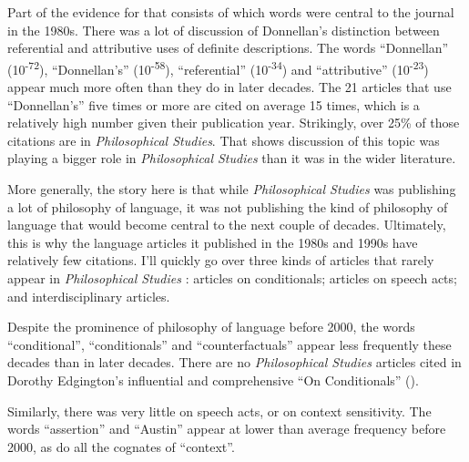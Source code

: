\documentclass[
  10pt,
  letterpaper,
  DIV=11,
  numbers=noendperiod,
  twoside]{scrartcl}
\begin{document}
Part of the evidence for that consists of which words were central to
the journal in the 1980s. There was a lot of discussion of Donnellan's
distinction between referential and attributive uses of definite
descriptions. The words ``Donnellan'' (10\textsuperscript{-72}),
``Donnellan's'' (10\textsuperscript{-58}), ``referential''
(10\textsuperscript{-34}) and ``attributive'' (10\textsuperscript{-23})
appear much more often than they do in later decades. The 21 articles
that use ``Donnellan's'' five times or more are cited on average 15
times, which is a relatively high number given their publication year.
Strikingly, over 25\% of those citations are in \emph{Philosophical
Studies}. That shows discussion of this topic was playing a bigger role
in \emph{Philosophical Studies} than it was in the wider literature.

More generally, the story here is that while \emph{Philosophical
Studies} was publishing a lot of philosophy of language, it was not
publishing the kind of philosophy of language that would become central
to the next couple of decades. Ultimately, this is why the language
articles it published in the 1980s and 1990s have relatively few
citations. I'll quickly go over three kinds of articles that rarely
appear in \emph{Philosophical Studies} : articles on conditionals;
articles on speech acts; and interdisciplinary articles.

Despite the prominence of philosophy of language before 2000, the words
``conditional'', ``conditionals'' and ``counterfactuals'' appear less
frequently these decades than in later decades. There are no
\emph{Philosophical Studies} articles cited in Dorothy Edgington's
influential and comprehensive ``On Conditionals''
().

Similarly, there was very little on speech acts, or on context
sensitivity. The words ``assertion'' and ``Austin'' appear at lower than
average frequency before 2000, as do all the cognates of ``context''.
\end{document}
